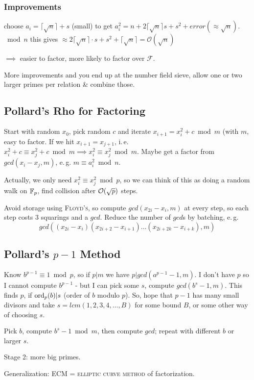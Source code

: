 \subsubsection{Improvements}

choose $a_i =  \lceil \sqrt{n} \rceil + s$ (small) to get $a_i^2 = n + 2 \lceil \sqrt{n} \rceil s + s^2 + error(\approx \sqrt{n})$.  $\bmod n$ this gives $\approx 2 \lceil \sqrt{n} \rceil \cdot s + s^2 + \lceil \sqrt{n} \rceil = \mathcal{O}(\sqrt{n})$

$\implies$ easier to factor, more likely to factor over $\mathcal{F}$.

More improvements and you end up at the number field sieve, allow one or two larger primes per relation \& combine those.

\subsection{Pollard's Rho for Factoring}

Start with random $x_0$, pick random $c$ and iterate $x_{i+1} = x_i^2 + c \bmod m$ (with $m$, easy to factor. If we hit $x_{i+1} = x_{j+1}$, i.\,e. $x_i^2 + c \equiv x_j^2 + c \bmod m \implies x_i^2 \equiv x_j^2 \bmod m$. Maybe get a factor from $gcd(x_i-x_j,m)$, e.\,g. $m \equiv a_i^2 \bmod n$.

Actually, we only need $x_i^2 \equiv x_j^2 \bmod p$, so we can think of this as doing a random walk on $\mathbb{F}_p$, find collision after $\mathcal O (\sqrt{p})$ steps.

Avoid storage using \textsc{Floyd's}, so compute $gcd(x_{2i} - x_i,m)$ at every step, so each step costs 3 squarings and a $gcd$. Reduce the number of $gcd$s by batching, e.\,g.
\[
gcd \left( (x_{2i} - x_i)(x_{2i+2}-x_{i+1})\dots(x_{2i+2k} - x_{i+k}), m \right)
\]

\subsection{Pollard's $p-1$ Method}

Know $b^{p-1} \equiv 1 \bmod p$, so if $p|m$ we have $p|gcd(a^{p-1}-1,m)$. I don't have $p$ so I cannot compute $b^{p-1}$ - but I can pick some $s$, compute $gcd(b^s-1,m)$. This finds $p$, if $\operatorname{ord}_p(b)|s$ (order of $b$ modulo $p$). So, hope that $p-1$ has many small divisors and take $s= lcm(1,2,3,4,\dots,B)$ for some bound $B$, or some other way of choosing $s$.

Pick $b$, compute $b^s-1 \bmod m$, then compute $gcd$; repeat with different $b$ or larger $s$.

\begin{remark}
Stage 2: more big primes.
\end{remark}

Generalization: \textsc{ECM} = \textsc{elliptic curve method} of factorization.